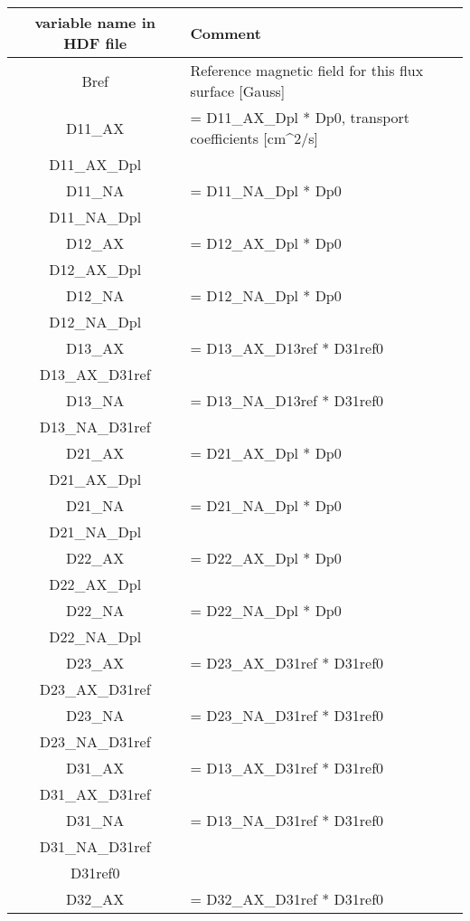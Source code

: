 \begin{table}[h]
\begin{tabular}{|c|l|}
\hline
variable name in HDF file  & Comment
\\
\hline
Bref & Reference magnetic field for this flux surface [Gauss] \\
\hline
D11\_AX & = D11\_AX\_Dpl * Dp0, transport coefficients [cm^2/s] \\
\hline
D11\_AX\_Dpl & \\
\hline
D11\_NA & = D11\_NA\_Dpl * Dp0 \\
\hline
D11\_NA\_Dpl & \\
\hline
D12\_AX & = D12\_AX\_Dpl * Dp0 \\
\hline
D12\_AX\_Dpl & \\
\hline
D12\_NA & = D12\_NA\_Dpl * Dp0 \\
\hline
D12\_NA\_Dpl & \\
\hline
D13\_AX & = D13\_AX\_D13ref * D31ref0 \\
\hline
D13\_AX\_D31ref & \\
\hline
D13\_NA & = D13\_NA\_D13ref * D31ref0 \\
\hline
D13\_NA\_D31ref & \\
\hline
D21\_AX & = D21\_AX\_Dpl * Dp0 \\
\hline
D21\_AX\_Dpl & \\
\hline
D21\_NA & = D21\_NA\_Dpl * Dp0 \\
\hline
D21\_NA\_Dpl & \\
\hline
D22\_AX & = D22\_AX\_Dpl * Dp0 \\
\hline
D22\_AX\_Dpl & \\
\hline
D22\_NA & = D22\_NA\_Dpl * Dp0 \\
\hline
D22\_NA\_Dpl & \\
\hline
D23\_AX & = D23\_AX\_D31ref * D31ref0 \\
\hline
D23\_AX\_D31ref & \\
\hline
D23\_NA & = D23\_NA\_D31ref * D31ref0 \\
\hline
D23\_NA\_D31ref & \\
\hline
D31\_AX & = D13\_AX\_D31ref * D31ref0 \\
\hline
D31\_AX\_D31ref & \\
\hline
D31\_NA & = D13\_NA\_D31ref * D31ref0 \\
\hline
D31\_NA\_D31ref & \\
\hline
D31ref0 & \\
\hline
D32\_AX & = D32\_AX\_D31ref * D31ref0 \\

\end{tabular}
\end{table}
